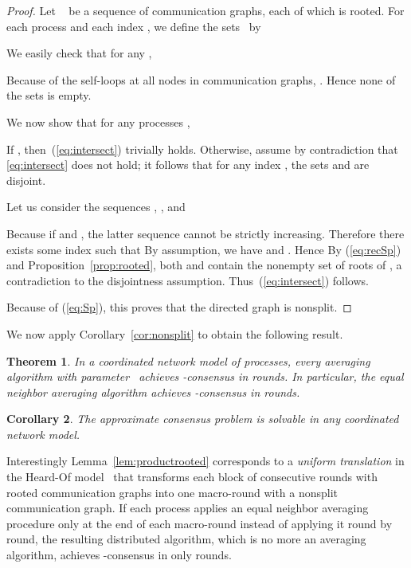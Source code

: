 \documentclass[a4paper]{article}
\theoremstyle{newthm}
\newtheorem{thm}{Theorem}
\newtheorem{cor}[thm]{Corollary}
\begin{document}
\begin{proof}
Let ~ be a sequence of  communication graphs,
	each of which is rooted.
For each process  and each index ,  we define the sets~ by  
	
We easily check that for any , 
	
Because of the self-loops at all nodes in communication graphs,
	 .
Hence none of the sets  is empty. 

We now show that for any processes ,

If , then~(\ref{eq:intersect}) trivially holds.
Otherwise, assume by contradiction that \eqref{eq:intersect} does not hold;
	it follows that for any index , the sets  and   are disjoint.
	
Let us consider the  sequences ,
	, and 
	
Because   if  and
	  , the latter sequence cannot be strictly
	increasing.
Therefore there exists some index 
	such that 
By assumption, we have   and .
Hence 
By (\ref{eq:recSp}) and Proposition~\ref{prop:rooted}, both  and  contain the
       nonempty set of  roots of , a contradiction to the disjointness assumption. 
Thus~(\ref{eq:intersect}) follows. 

\noindent Because of (\ref{eq:Sp}), this proves that the directed graph  is nonsplit.
\end{proof}

We now apply Corollary~\ref{cor:nonsplit} to obtain  the following result.

\begin{thm}\label{thm:coord}
In a coordinated network model of  processes, every averaging algorithm with parameter~
	achieves -consensus in 
	 rounds.
In particular, the equal neighbor averaging algorithm achieves -consensus in 
	 rounds. 
\end{thm}

\begin{cor}\label{cor:solvac}
The approximate consensus problem is solvable in any coordinated network model.
\end{cor}

Interestingly Lemma~\ref{lem:productrooted} corresponds to a {\em uniform translation} in the
	Heard-Of model~\cite{CS09} that transforms  each block of  consecutive rounds with
	rooted communication graphs into one  macro-round with a  nonsplit  communication graph.
If each process applies an equal neighbor averaging procedure only at the end of each macro-round instead of
	applying it round by round, the resulting distributed algorithm, which is no more an averaging 
	algorithm, achieves -consensus in only
	 rounds.
	 
\end{document}
